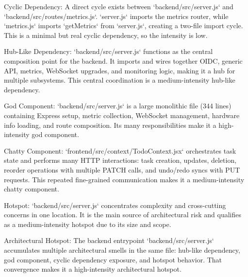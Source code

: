 Cyclic Dependency:
A direct cycle exists between `backend/src/server.js` and `backend/src/routes/metrics.js`. `server.js` imports the metrics router, while `metrics.js` imports `getMetrics` from `server.js`, creating a two-file import cycle. This is a minimal but real cyclic dependency, so the intensity is low.

Hub-Like Dependency:
`backend/src/server.js` functions as the central composition point for the backend. It imports and wires together OIDC, generic API, metrics, WebSocket upgrades, and monitoring logic, making it a hub for multiple subsystems. This central coordination is a medium-intensity hub-like dependency.

God Component:
`backend/src/server.js` is a large monolithic file (344 lines) containing Express setup, metric collection, WebSocket management, hardware info loading, and route composition. Its many responsibilities make it a high-intensity god component.

Chatty Component:
`frontend/src/context/TodoContext.jsx` orchestrates task state and performs many HTTP interactions: task creation, updates, deletion, reorder operations with multiple PATCH calls, and undo/redo syncs with PUT requests. This repeated fine-grained communication makes it a medium-intensity chatty component.

Hotspot:
`backend/src/server.js` concentrates complexity and cross-cutting concerns in one location. It is the main source of architectural risk and qualifies as a medium-intensity hotspot due to its size and scope.

Architectural Hotspot:
The backend entrypoint `backend/src/server.js` accumulates multiple architectural smells in the same file: hub-like dependency, god component, cyclic dependency exposure, and hotspot behavior. That convergence makes it a high-intensity architectural hotspot.
